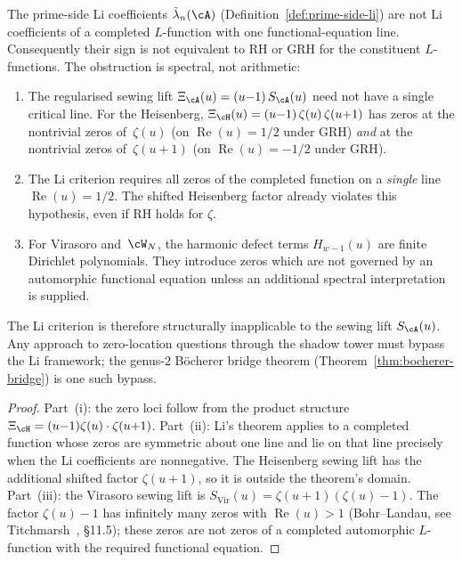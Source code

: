 \begin{proposition}%
\label{prop:li-criterion-failure}%
%
%
The prime-side Li coefficients
$\tilde\lambda_n(\cA)$
\textup{(}Definition~\textup{\ref{def:prime-side-li}}\textup{)}
are not Li coefficients of a completed $L$-function with one
functional-equation line. Consequently their sign is not equivalent to
RH or GRH for the constituent $L$-functions. The obstruction is
spectral, not arithmetic\textup{:}
\begin{enumerate}[label=\textup{(\roman*)}]
\item
The regularised sewing lift
$\Xi_\cA(u) = (u{-}1)\,S_\cA(u)$
need not have a single critical line.
For the Heisenberg,
$\Xi_\cH(u) = (u{-}1)\,\zeta(u)\,\zeta(u{+}1)$
has zeros at the nontrivial zeros of~$\zeta(u)$
\textup{(}on $\operatorname{Re}(u) = 1/2$ under GRH\textup{)}
\emph{and} at the nontrivial zeros of~$\zeta(u{+}1)$
\textup{(}on $\operatorname{Re}(u) = -1/2$ under GRH\textup{)}.
\item
The Li criterion requires all zeros of the completed function
on a \emph{single} line $\operatorname{Re}(u) = 1/2$. The shifted
Heisenberg factor already violates this hypothesis, even if RH holds
for $\zeta$.
\item
For Virasoro and~$\cW_N$, the harmonic defect terms
$H_{w-1}(u)$ are finite Dirichlet polynomials. They introduce zeros
which are not governed by an automorphic functional equation unless an
additional spectral interpretation is supplied.
\end{enumerate}
The Li criterion is therefore structurally inapplicable
to the sewing lift $S_\cA(u)$. Any approach to zero-location
questions through the shadow tower must bypass the Li
framework; the genus-$2$ B\"ocherer bridge theorem
\textup{(}Theorem~\textup{\ref{thm:bocherer-bridge}}\textup{)}
is one such bypass.
\end{proposition}

\begin{proof}
Part~(i): the zero loci follow from the product structure
$\Xi_\cH = (u{-}1)\zeta(u) \cdot \zeta(u{+}1)$.
Part~(ii): Li's theorem applies to a completed function whose zeros
are symmetric about one line and lie on that line precisely when the
Li coefficients are nonnegative. The Heisenberg sewing lift has the
additional shifted factor $\zeta(u+1)$, so it is outside the theorem's
domain.
Part~(iii): the Virasoro sewing lift is
$S_{\mathrm{Vir}}(u) = \zeta(u{+}1)(\zeta(u) - 1)$.
The factor $\zeta(u) - 1$ has infinitely many zeros
with $\operatorname{Re}(u) > 1$
\textup{(}Bohr--Landau, see
Titchmarsh~\cite{Titchmarsh-zeta}, \S11.5\textup{)};
these zeros are not zeros of a completed automorphic $L$-function
with the required functional equation.
\end{proof}

